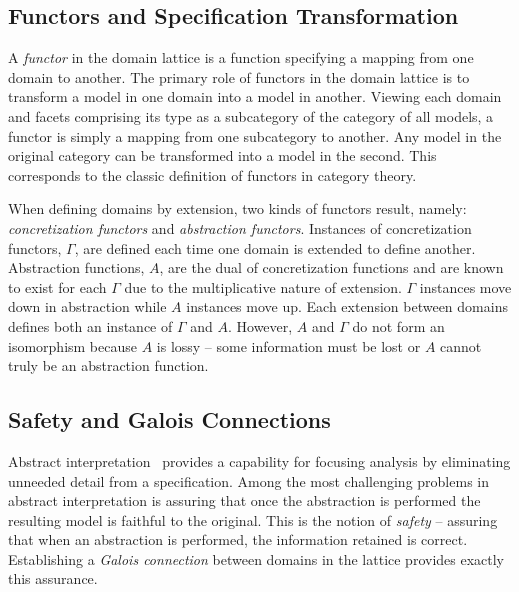\documentclass[12pt]{article}
\begin{document}
\subsection{Functors and Specification Transformation}


A \emph{functor} in the domain lattice is a function specifying a mapping from one domain
to another.  The primary role of functors in the domain lattice is to transform a model in
one domain into a model in another.  Viewing each domain and facets comprising its type as
a subcategory of the category of all models, a functor is simply a mapping from one
subcategory to another.  Any model in the original category can be transformed into a
model in the second.  This corresponds to the classic definition of functors in category
theory.


When defining domains by extension, two kinds of functors result, namely:
\emph{concretization functors} and \emph{abstraction functors}.  Instances of
concretization functors, $\Gamma$, are defined each time one domain is extended to define
another.  Abstraction functions, $A$, are the dual of concretization functions and are
known to exist for each $\Gamma$ due to the multiplicative nature of extension.  $\Gamma$
instances move down in abstraction while $A$ instances move up.  Each extension between
domains defines both an instance of $\Gamma$ and $A$.  However, $A$ and $\Gamma$ do not
form an isomorphism because $A$ is lossy -- some information must be lost or $A$ cannot
truly be an abstraction function.

\subsection{Safety and Galois Connections}

Abstract interpretation~\cite{Cousot:00:Abstract-Interp} provides a capability for
focusing analysis by eliminating unneeded detail from a specification.  Among the most
challenging problems in abstract interpretation is assuring that once the abstraction is
performed the resulting model is faithful to the original. This is the notion of
\emph{safety} -- assuring that when an abstraction is performed, the information retained
is correct.  Establishing a \emph{Galois connection} \cite{Nielson:05:Principles-of-P}
between domains in the lattice provides exactly this assurance.
\end{document}
